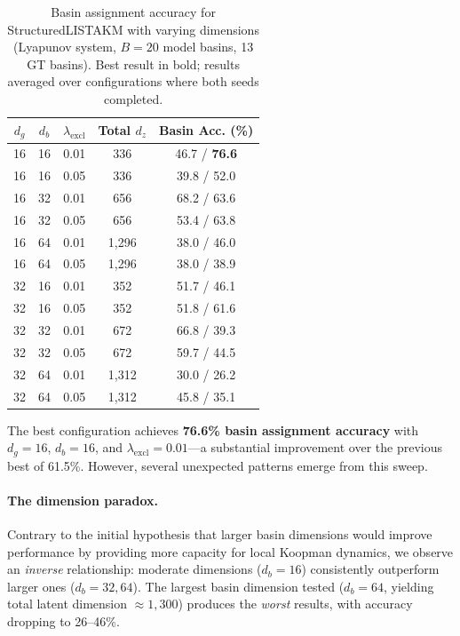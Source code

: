 \begin{table}[h]
\centering
\caption{Basin assignment accuracy for StructuredLISTAKM with varying dimensions (Lyapunov system, $B=20$ model basins, 13 GT basins). Best result in bold; results averaged over configurations where both seeds completed.}
\label{tab:large-dim-sweep}
\begin{tabular}{ccccc}
\toprule
$d_g$ & $d_b$ & $\lambda_{\text{excl}}$ & Total $d_z$ & Basin Acc. (\%) \\
\midrule
16 & 16 & 0.01 & 336 & 46.7 / \textbf{76.6} \\
16 & 16 & 0.05 & 336 & 39.8 / 52.0 \\
16 & 32 & 0.01 & 656 & 68.2 / 63.6 \\
16 & 32 & 0.05 & 656 & 53.4 / 63.8 \\
16 & 64 & 0.01 & 1,296 & 38.0 / 46.0 \\
16 & 64 & 0.05 & 1,296 & 38.0 / 38.9 \\
\midrule
32 & 16 & 0.01 & 352 & 51.7 / 46.1 \\
32 & 16 & 0.05 & 352 & 51.8 / 61.6 \\
32 & 32 & 0.01 & 672 & 66.8 / 39.3 \\
32 & 32 & 0.05 & 672 & 59.7 / 44.5 \\
32 & 64 & 0.01 & 1,312 & 30.0 / 26.2 \\
32 & 64 & 0.05 & 1,312 & 45.8 / 35.1 \\
\bottomrule
\end{tabular}
\end{table}

The best configuration achieves \textbf{76.6\% basin assignment accuracy} with $d_g = 16$, $d_b = 16$, and $\lambda_{\text{excl}} = 0.01$---a substantial improvement over the previous best of 61.5\%. However, several unexpected patterns emerge from this sweep.

\paragraph{The dimension paradox.}
Contrary to the initial hypothesis that larger basin dimensions would improve performance by providing more capacity for local Koopman dynamics, we observe an \emph{inverse} relationship: moderate dimensions ($d_b = 16$) consistently outperform larger ones ($d_b = 32, 64$). The largest basin dimension tested ($d_b = 64$, yielding total latent dimension $\approx 1,300$) produces the \emph{worst} results, with accuracy dropping to 26--46\%.

